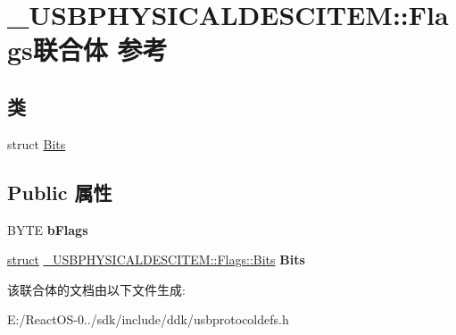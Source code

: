 \hypertarget{union___u_s_b_p_h_y_s_i_c_a_l_d_e_s_c_i_t_e_m_1_1_flags}{}\section{\+\_\+\+U\+S\+B\+P\+H\+Y\+S\+I\+C\+A\+L\+D\+E\+S\+C\+I\+T\+EM\+:\+:Flags联合体 参考}
\label{union___u_s_b_p_h_y_s_i_c_a_l_d_e_s_c_i_t_e_m_1_1_flags}
\subsection*{类}
\begin{DoxyCompactItemize}
\item 
struct \hyperlink{struct___u_s_b_p_h_y_s_i_c_a_l_d_e_s_c_i_t_e_m_1_1_flags_1_1_bits}{Bits}
\end{DoxyCompactItemize}
\subsection*{Public 属性}
\begin{DoxyCompactItemize}
\item 
\mbox{\label{union___u_s_b_p_h_y_s_i_c_a_l_d_e_s_c_i_t_e_m_1_1_flags_a980148b9f03a0bb0e6da5930ecf9a5fd}} 
B\+Y\+TE {\bfseries b\+Flags}
\item 
\mbox{\label{union___u_s_b_p_h_y_s_i_c_a_l_d_e_s_c_i_t_e_m_1_1_flags_aecdcb8bd19ce603bfe275cc211774cd7}} 
\hyperlink{interfacestruct}{struct} \hyperlink{struct___u_s_b_p_h_y_s_i_c_a_l_d_e_s_c_i_t_e_m_1_1_flags_1_1_bits}{\+\_\+\+U\+S\+B\+P\+H\+Y\+S\+I\+C\+A\+L\+D\+E\+S\+C\+I\+T\+E\+M\+::\+Flags\+::\+Bits} {\bfseries Bits}
\end{DoxyCompactItemize}


该联合体的文档由以下文件生成\+:\begin{DoxyCompactItemize}
\item 
E\+:/\+React\+O\+S-\/0../sdk/include/ddk/usbprotocoldefs.\+h\end{DoxyCompactItemize}
